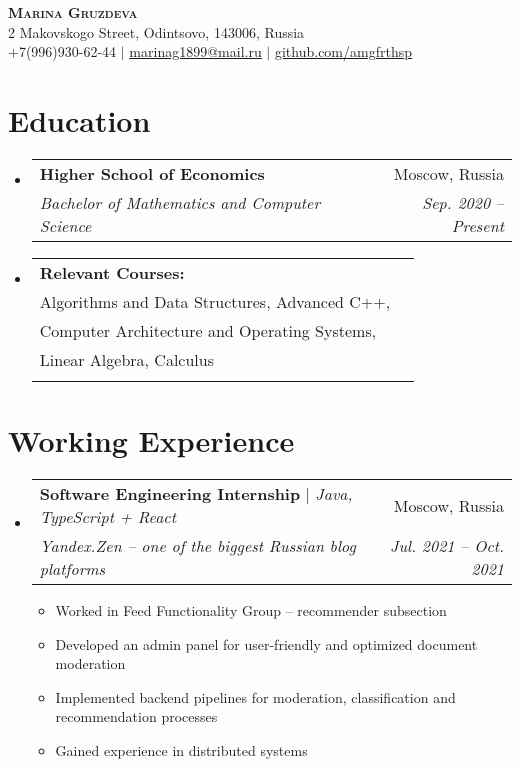 \documentclass[letterpaper,11pt]{article}
\makeatletter
\newcommand{\resumeItem}[1]{
  \item\small{
    {#1 \vspace{-2pt}}
  }
}
\newcommand{\resumeSubheading}[4]{
  \vspace{-2pt}\item
    \begin{tabular*}{0.97\textwidth}[t]{l@{\extracolsep{\fill}}r}
      #1 & #2 \\
      \textit{\small#3} & \textit{\small #4} \\
    \end{tabular*}\vspace{-7pt}
}
\newcommand{\resumeSubHeadingListStart}{\begin{itemize}[leftmargin=0.15in, label={}]}
\newcommand{\resumeSubHeadingListEnd}{\end{itemize}}
\newcommand{\resumeItemListStart}{\begin{itemize}}
\newcommand{\resumeItemListEnd}{\end{itemize}\vspace{-5pt}}
\makeatother
\begin{document}

\begin{center}
    \textbf{\Huge \scshape Marina Gruzdeva} \\ \vspace{15pt}
    \small 2 Makovskogo Street, Odintsovo, 143006, Russia \\ \vspace{10pt}
    \small +7(996)930-62-44 $|$ \href{mailto:marinag1899@mail.ru}{\underline{marinag1899@mail.ru}} $|$ 
    \href{https://github.com/amgfrthsp}{\underline{github.com/amgfrthsp}}
\end{center}


\section{Education}
  \resumeSubHeadingListStart
    \resumeSubheading
      {\textbf{Higher School of Economics}}{Moscow, Russia}
      {Bachelor of Mathematics and Computer Science}{Sep. 2020 -- Present}
    \resumeSubheading
      {\textbf{Relevant Courses:}\\ Algorithms and Data Structures, Advanced C++,\\ Computer Architecture and Operating Systems,\\ Linear Algebra, Calculus}{}{}{}
  \resumeSubHeadingListEnd


\section{Working Experience}
  \resumeSubHeadingListStart

    \resumeSubheading
      {\textbf{Software Engineering Internship} $|$ \emph{Java, TypeScript + React}}
      {Moscow, Russia}
      {Yandex.Zen -- one of the biggest Russian blog platforms}
      {Jul. 2021 -- Oct. 2021}
      \resumeItemListStart
        \resumeItem{Worked in Feed Functionality Group -- recommender subsection}
        \resumeItem{Developed an admin panel for user-friendly and optimized document moderation}
        \resumeItem{Implemented backend pipelines for moderation, classification and recommendation processes}
        \resumeItem{Gained experience in distributed systems}
      \resumeItemListEnd
   \resumeSubHeadingListEnd
\end{document}
